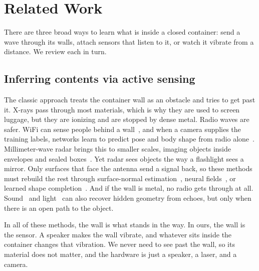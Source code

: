 \section{Related Work}
\label{sec:related}

There are three broad ways to learn what is inside a closed container: send a wave through its walls, attach sensors that listen to it, or watch it vibrate from a distance.
We review each in turn.

\subsection{Inferring contents via active sensing}
The classic approach treats the container wall as an obstacle and tries to get past it.
X-rays pass through most materials, which is why they are used to screen luggage, but they are ionizing and are stopped by dense metal.
Radio waves are safer.
WiFi can sense people behind a wall~\cite{adib2013see}, and when a camera supplies the training labels, networks learn to predict pose and body shape from radio alone~\cite{zhao2018rfpose,wang2019personinwifi,geng2022densepose}.
Millimeter-wave radar brings this to smaller scales, imaging objects inside envelopes and sealed boxes~\cite{ganse2021envelopes,dodds2025mmnorm,lu2026geraf,dodds2025waveformer}.
Yet radar sees objects the way a flashlight sees a mirror.
Only surfaces that face the antenna send a signal back, so these methods must rebuild the rest through surface-normal estimation~\cite{dodds2025mmnorm}, neural fields~\cite{lu2026geraf}, or learned shape completion~\cite{dodds2025waveformer}.
And if the wall is metal, no radio gets through at all.
Sound~\cite{lindell2019acoustic,christensen2020batvision} and light~\cite{velten2012recovering} can also recover hidden geometry from echoes, but only when there is an open path to the object.

In all of these methods, the wall is what stands in the way.
In ours, the wall is the sensor.
A speaker makes the wall vibrate, and whatever sits inside the container changes that vibration.
We never need to see past the wall, so its material does not matter, and the hardware is just a speaker, a laser, and a camera.

